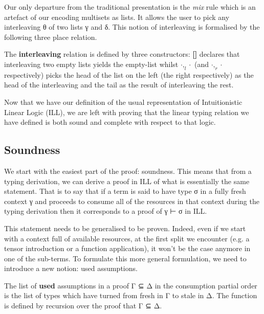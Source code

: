 \documentclass[a4paper,UKenglish]{lipics-v2016}
\begin{document}


Our only departure from the traditional presentation is the \textit{mix}
rule which is an artefact of our encoding multisets as lists. It allows
the user to pick any interleaving θ of two lists γ and δ. This notion of
interleaving is formalised by the following three place relation.

\begin{definition} The \textbf{interleaving} relation is defined by three
constructors: \textbf{[]} declares that interleaving two empty lists yields
the empty-list whilst \textbf{$\cdot,_{l}\cdot$} (and \textbf{$\cdot,_{r}\cdot$}
respectively) picks the head of the list on the left (the right respectively)
as the head of the interleaving and the tail as the result of interleaving
the rest.

\end{definition}

Now that we have our definition of the usual representation of Intuitionistic
Linear Logic (ILL), we are left with proving that the linear typing relation
we have defined is both sound and complete with respect to that logic.

\subsection{Soundness}

We start with the easiest part of the proof: soundness. This means that from
a typing derivation, we can derive a proof in ILL of what is essentially the
same statement. That is to say that if a term is said to have type σ in a fully
fresh context γ and proceeds to consume all of the resources in that context
during the typing derivation then it corresponds to a proof of γ ⊢ σ in ILL.

This statement needs to be generalised to be proven. Indeed, even if we start
with a context full of available resources, at the first split we encounter
(e.g. a tensor introduction or a function application), it won't be the case
anymore in one of the sub-terms. To formulate this more general formulation,
we need to introduce a new notion: used assumptions.

\begin{definition}The list of \textbf{used} assumptions in a proof Γ ⊆ Δ in
the consumption partial order is the list of types which have turned from
fresh in Γ to stale in Δ. The \used{\cdot} function is defined by recursion
over the proof that Γ ⊆ Δ.
\end{definition}
\end{document}
